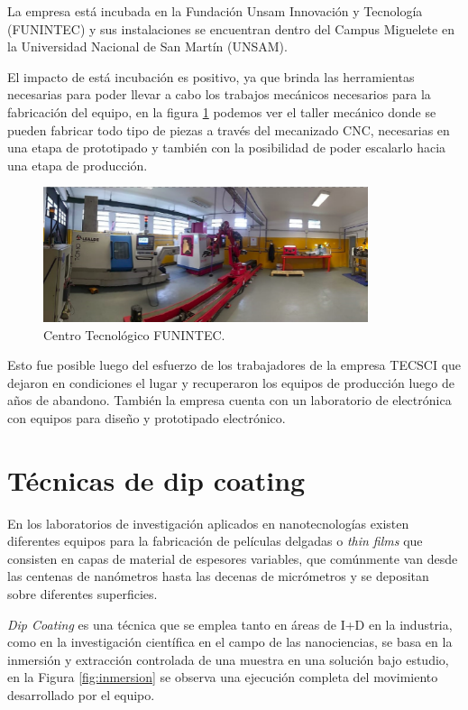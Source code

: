 La empresa está incubada en la Fundación Unsam Innovación y Tecnología  (FUNINTEC) y sus instalaciones se encuentran dentro del Campus Miguelete en la Universidad Nacional de San Martín (UNSAM). 

El impacto de está incubación es positivo, ya que brinda las herramientas necesarias para poder llevar a cabo los trabajos mecánicos necesarios para la fabricación del equipo, en la figura \ref{fig:taller} podemos ver el taller mecánico donde se pueden fabricar todo tipo de piezas a través del mecanizado CNC, necesarias en una etapa de prototipado y también con la posibilidad de poder escalarlo hacia una etapa de producción. 

\clearpage
\begin{figure}[htpb]
\centering 
\includegraphics[width=0.85\textwidth]{./Figures/taller_v3.pdf}
\caption{Centro Tecnológico FUNINTEC.}
\label{fig:taller}
\end{figure}


Esto fue posible luego del esfuerzo de los trabajadores de la empresa TECSCI que dejaron en condiciones el lugar y recuperaron los equipos de producción luego de años de abandono.
También la empresa cuenta con un laboratorio de electrónica con equipos para diseño y prototipado electrónico.



\section{Técnicas de dip coating}

En los laboratorios de investigación aplicados en nanotecnologías existen diferentes equipos para la fabricación de películas delgadas o \textit{thin films} que consisten en capas de material de espesores variables, que comúnmente van desde las centenas de nanómetros hasta las decenas de micrómetros y se depositan sobre diferentes superficies.


\textit{Dip Coating} es una técnica que se emplea tanto en áreas de I+D en la industria, como en la investigación científica en el campo de las nanociencias, se basa en la inmersión y extracción  controlada de una muestra en una solución bajo estudio, en la Figura \ref{fig:inmersion} se observa una ejecución completa del movimiento desarrollado por el equipo.


